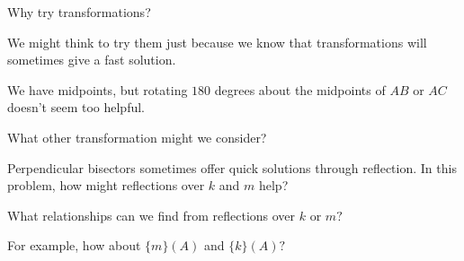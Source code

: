 Why try transformations?






We might think to try them just because we know that transformations will sometimes give a fast solution.

We have midpoints, but rotating $180$ degrees about the midpoints of $AB$ or $AC$ doesn't seem too helpful.

What other transformation might we consider?



Perpendicular bisectors sometimes offer quick solutions through reflection.  In this problem, how might reflections over $k$ and $m$ help?

What relationships can we find from reflections over $k$ or $m?$

For example, how about $\{m\} (A)$ and $\{k\} (A) ?$





